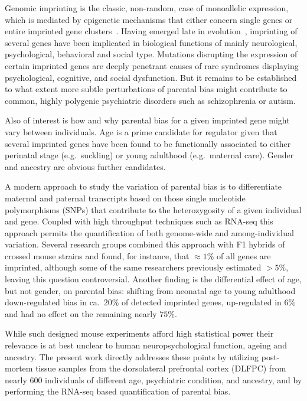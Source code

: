 \documentclass[letterpaper]{article}
\begin{document}
Genomic imprinting is the classic, non-random, case of monoallelic expression,
which is mediated by epigenetic mechanisms that either concern single genes or
entire imprinted gene clusters~\cite{Peters2014,Plasschaert2014}.  Having
emerged late in evolution~\cite{Tucci2016}, imprinting of several genes have
been implicated in biological functions of mainly neurological, psychological,
behavioral and social type.  Mutations disrupting the expression of certain
imprinted genes are deeply penetrant causes of rare syndromes displaying
psychological, cognitive, and social dysfunction.  But it remains to be
established to what extent more subtle perturbations of parental bias might
contribute to common, highly polygenic psychiatric disorders such as
schizophrenia or autism.

Also of interest is how and why parental bias for a given imprinted gene
might vary between individuals.  Age is a prime candidate for regulator
given that several imprinted genes have been found to be functionally associated to either
perinatal stage (e.g.~suckling) or young adulthood (e.g.~maternal care).
Gender and ancestry are obvious further candidates.

A modern approach to study the variation of parental bias is to differentiate
maternal and paternal transcripts based on those single nucleotide
polymorphisms (SNPs) that contribute to the heterozygosity of a given
individual and gene.  Coupled with high throughput techniques such as RNA-seq
this approach permits the quantification of both genome-wide and
among-individual variation.  Several research groups
\cite{Gregg2010a,Perez2015,DeVeale2012} combined this approach with F1 hybrids
of crossed mouse strains and found, for instance, that \(\approx 1\%\) of all
genes are imprinted, although some \cite{Perez2015} of the same researchers
previously estimated \(> 5\%\), leaving this question controversial.
Another finding is the differential effect of age, but not gender, on parental
bias: shifting from neonatal age to young adulthood down-regulated bias in
ca.~\(20\%\) of detected imprinted genes, up-regulated in \(6\%\) and had no
effect on the remaining nearly \(75\%\).

While such designed mouse experiments afford high statistical power their
relevance is at best unclear to human neuropsychological function, ageing and
ancestry.  The present work directly addresses these points by utilizing
post-mortem tissue samples from the dorsolateral prefrontal cortex (DLFPC)
from nearly 600 individuals of different age, psychiatric condition, and
ancestry, and by performing the RNA-seq based quantification of parental bias.
\end{document}
